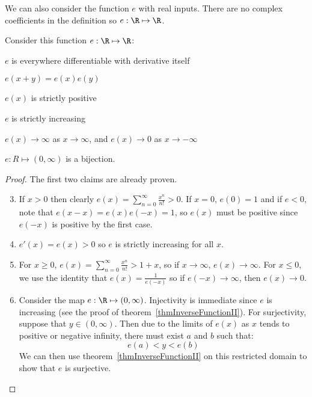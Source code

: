 \documentclass[../Main.tex]{subfiles}
\begin{document}
We can also consider the function $e$ with real inputs. There are no complex coefficients in the definition so $e : \R \mapsto \R$.
\begin{propositions}{
        Consider this function $e : \R \mapsto \R$:
        \label{propsExpRealProps}
    }   
    \item $e$ is everywhere differentiable with derivative itself \label{propExpDifferentiableReal}
    \item $e(x + y) = e(x) e(y)$ \label{propExpAdditivityReal}
    \item $e(x)$ is strictly positive \label{propExpPositive}
    \item $e$ is strictly increasing \label{propExpIncreasing}
    \item $e(x) \to \infty$ as $x \to \infty$, and $e(x) \to 0$ as $x \to -\infty$ \label{propExpLimits}
    \item $e : R \mapsto (0, \infty)$ is a bijection. \label{propExpBijection}
\end{propositions}
\begin{proof}
    The first two claims are already proven.
    \begin{enumerate}
        \setcounter{enumi}{2} %
        \item If $x > 0$ then clearly $e(x) = \sum_{n = 0}^\infty \frac{x^n}{n!} > 0$.
            If $x = 0$, $e(0) = 1$ and if $e < 0$, note that $e(x - x) = e(x) e(-x) = 1$, so $e(x)$ must be positive since $e(-x)$ is positive by the first case.
        \item $e'(x) = e(x) > 0$ so $e$ is strictly increasing for all $x$.
        \item For $x \geq 0$, $e(x) = \sum_{n = 0}^\infty \frac{x^n}{n!} > 1 + x$, so if $x \to \infty$, $e(x) \to \infty$. For $x \leq 0$, we use the identity that $e(x) = \frac{1}{e(-x)}$ so if $e(-x) \to \infty$, then $e(x) \to 0$.
        \item Consider the map $e : \R \mapsto (0, \infty)$.
            Injectivity is immediate since $e$ is increasing (see the proof of theorem~\ref{thmInverseFunctionII}). For surjectivity, suppose that $y \in (0, \infty)$. Then due to the limits of $e(x)$ as $x$ tends to positive or negative infinity, there must exist $a$ and $b$ such that:
            \begin{equation*}
                e(a) < y < e(b)
            \end{equation*}
            We can then use theorem~\ref{thmInverseFunctionII} on this restricted domain to show that $e$ is surjective.
    \end{enumerate}
\end{proof}
\end{document}
